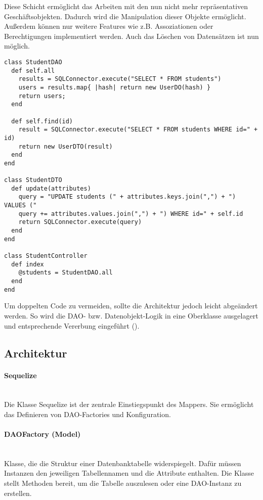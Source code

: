 Diese Schicht ermöglicht das Arbeiten mit den nun nicht mehr repräsentativen Geschäftsobjekten. Dadurch wird die Manipulation dieser Objekte ermöglicht. Außerdem können nur weitere Features wie z.B. Assoziationen oder Berechtigungen implementiert werden. Auch das Löschen von Datensätzen ist nun möglich.

\begin{lstlisting}[caption=Objektrelationale Zugriffsschicht]
class StudentDAO
  def self.all
    results = SQLConnector.execute("SELECT * FROM students")
    users = results.map{ |hash| return new UserDO(hash) }
    return users;
  end
  
  def self.find(id)
    result = SQLConnector.execute("SELECT * FROM students WHERE id=" + id)
    return new UserDTO(result)
  end
end

class StudentDTO
  def update(attributes)
    query = "UPDATE students (" + attributes.keys.join(",") + ") VALUES ("
    query += attributes.values.join(",") + ") WHERE id=" + self.id
    return SQLConnector.execute(query)
  end
end

class StudentController
  def index
    @students = StudentDAO.all
  end
end
\end{lstlisting}

Um doppelten Code zu vermeiden, sollte die Architektur jedoch leicht abgeändert werden. So wird die DAO- bzw. Datenobjekt-Logik in eine Oberklasse ausgelagert und entsprechende Vererbung eingeführt (\cite[S. 11]{Depo1}).


\subsection{Architektur}

\paragraph{Sequelize} \hspace{0pt} \\
Die Klasse Sequelize ist der zentrale Einstiegspunkt des Mappers. Sie ermöglicht das Definieren von DAO-Factories und Konfiguration.

\paragraph{DAOFactory (Model)} \hspace{0pt} \\
Klasse, die die Struktur einer Datenbanktabelle widerspiegelt. Dafür müssen Instanzen den jeweiligen Tabellennamen und die Attribute enthalten. Die Klasse stellt Methoden bereit, um die Tabelle auszulesen oder eine DAO-Instanz zu erstellen.

